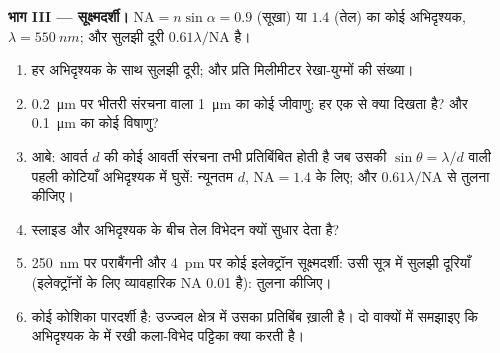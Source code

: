 \begin{problem}
\medskip
\noindent\textbf{भाग III --- सूक्ष्मदर्शी।}
 $\mathrm{NA} = n\sin\alpha = 0.9$ (सूखा) या $1.4$
(तेल) का कोई अभिदृश्यक, $\lambda = \qty{550}{nm}$; और सुलझी दूरी $0.61\lambda/\mathrm{NA}$ है।
\begin{enumerate}[resume]
  \item हर अभिदृश्यक के साथ सुलझी दूरी; और प्रति मिलीमीटर रेखा-युग्मों
        की संख्या।
  \item \qty{0.2}{\micro m} पर भीतरी संरचना वाला \qty{1}{\micro m} का कोई जीवाणु:
        हर एक से क्या दिखता है? और \qty{0.1}{\micro m} का कोई विषाणु?
  \item आबे: आवर्त $d$ की कोई आवर्ती संरचना तभी प्रतिबिंबित होती है जब उसकी
        $\sin\theta = \lambda/d$ वाली पहली कोटियाँ अभिदृश्यक में घुसें: न्यूनतम $d$,
        $\mathrm{NA} = 1.4$ के लिए; और $0.61\lambda/\mathrm{NA}$ से तुलना कीजिए।
  \item स्लाइड और अभिदृश्यक के बीच तेल विभेदन क्यों सुधार
        देता है?
  \item \qty{250}{nm} पर पराबैंगनी और \qty{4}{pm} पर कोई इलेक्ट्रॉन सूक्ष्मदर्शी:
        उसी सूत्र में सुलझी दूरियाँ (इलेक्ट्रॉनों के लिए
        व्यावहारिक NA \qty{0.01}{} है): तुलना कीजिए।
  \item कोई कोशिका पारदर्शी है: उज्ज्वल क्षेत्र में उसका प्रतिबिंब ख़ाली है।
        दो वाक्यों में समझाइए कि अभिदृश्यक के  में रखी
        कला-विभेद पट्टिका क्या करती है।
\end{enumerate}


\end{problem}
